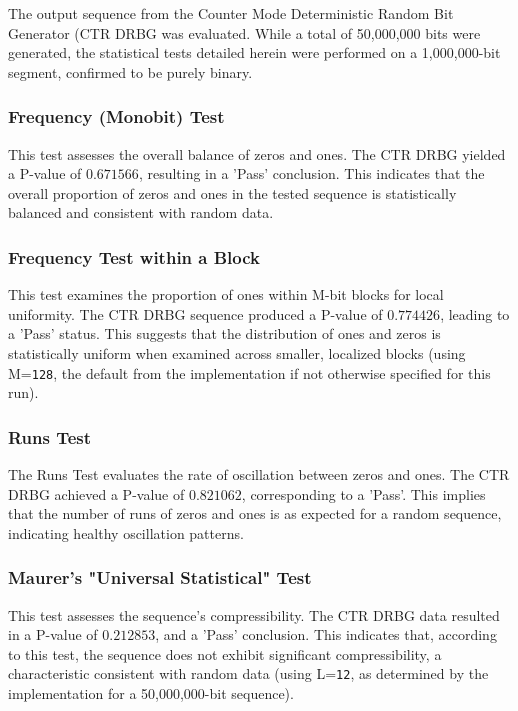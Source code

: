 The output sequence from the Counter Mode Deterministic Random Bit Generator (CTR DRBG was evaluated. While a total of 50,000,000 bits were generated, the statistical tests detailed herein were performed on a 1,000,000-bit segment, confirmed to be purely binary.

\subsubsection{\textbf{Frequency (Monobit) Test}}
This test assesses the overall balance of zeros and ones. The CTR DRBG yielded a P-value of $0.671566$, resulting in a 'Pass' conclusion. This indicates that the overall proportion of zeros and ones in the tested sequence is statistically balanced and consistent with random data.

\subsubsection{\textbf{Frequency Test within a Block}}
This test examines the proportion of ones within M-bit blocks for local uniformity. The CTR DRBG sequence produced a P-value of $0.774426$, leading to a 'Pass' status. This suggests that the distribution of ones and zeros is statistically uniform when examined across smaller, localized blocks (using M=\texttt{128}, the default from the implementation if not otherwise specified for this run).

\subsubsection{\textbf{Runs Test}}
The Runs Test evaluates the rate of oscillation between zeros and ones. The CTR DRBG achieved a P-value of $0.821062$, corresponding to a 'Pass'. This implies that the number of runs of zeros and ones is as expected for a random sequence, indicating healthy oscillation patterns.

\subsubsection{\textbf{Maurer's "Universal Statistical" Test}}
This test assesses the sequence's compressibility. The CTR DRBG data resulted in a P-value of $0.212853$, and a 'Pass' conclusion. This indicates that, according to this test, the sequence does not exhibit significant compressibility, a characteristic consistent with random data (using L=\texttt{12}, as determined by the implementation for a 50,000,000-bit sequence).

